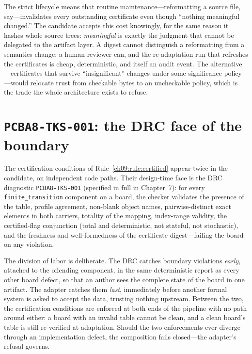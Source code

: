 \begin{remark}\label{ch09:rem:staleness}
The strict lifecycle means that routine maintenance---reformatting a source file, say---invalidates every outstanding certificate even though ``nothing meaningful changed.'' The candidate accepts this cost knowingly, for the same reason it hashes whole source trees: \emph{meaningful} is exactly the judgment that cannot be delegated to the artifact layer. A digest cannot distinguish a reformatting from a semantics change; a human reviewer can, and the re-adaptation run that refreshes the certificates is cheap, deterministic, and itself an audit event. The alternative---certificates that survive ``insignificant'' changes under some significance policy---would relocate trust from checkable bytes to an uncheckable policy, which is the trade the whole architecture exists to refuse.
\end{remark}

\section{\texttt{PCBA8-TKS-001}: the DRC face of the boundary}\label{ch09:sec:tks001}

The certification conditions of Rule~\ref{ch09:rule:certified} appear twice in the candidate, on independent code paths. Their design-time face is the DRC diagnostic \texttt{PCBA8-TKS-001} (specified in full in Chapter~7): for every \texttt{finite\_transition} component on a board, the checker validates the presence of the table, profile agreement, non-blank object names, pairwise-distinct exact elements in both carriers, totality of the mapping, index-range validity, the certified-flag conjunction (total and deterministic, not stateful, not stochastic), and the freshness and well-formedness of the certificate digest---failing the board on any violation.

The division of labor is deliberate. The DRC catches boundary violations \emph{early}, attached to the offending component, in the same deterministic report as every other board defect, so that an author sees the complete state of the board in one artifact. The adapter catches them \emph{last}, immediately before another formal system is asked to accept the data, trusting nothing upstream. Between the two, the certification conditions are enforced at both ends of the pipeline with no path around either: a board with an invalid table cannot be clean, and a clean board's table is still re-verified at adaptation. Should the two enforcements ever diverge through an implementation defect, the composition fails closed---the adapter's refusal governs.

